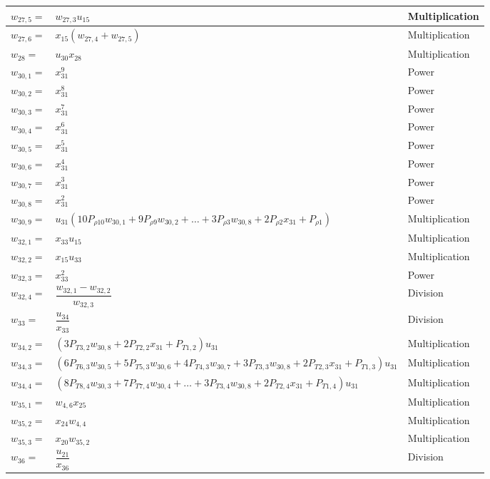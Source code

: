 \begin{longtable}{|p{1.5cm}|l|p{2cm}|}
$w_{27,5}=$ & $ w_{27,3}u_{15} $ & Multiplication \\ \hline
$w_{27,6}=$ & $ x_{15}\left(w_{27,4}+w_{27,5}\right) $ & Multiplication \\ \hline 
$w_{28}=$ & $ u_{30}x_{28} $ & Multiplication \\ \hline
$w_{30,1}=$ & $ x_{31}^{9} $ & Power \\ \hline
$w_{30,2}=$ & $ x_{31}^{8} $ & Power \\ \hline
$w_{30,3}=$ & $ x_{31}^{7} $ & Power \\ \hline
$w_{30,4}=$ & $ x_{31}^{6} $ & Power \\ \hline
$w_{30,5}=$ & $ x_{31}^{5} $ & Power \\ \hline
$w_{30,6}=$ & $ x_{31}^{4} $ & Power \\ \hline
$w_{30,7}=$ & $ x_{31}^{3} $ & Power \\ \hline
$w_{30,8}=$ & $ x_{31}^{2} $ & Power \\ \hline
$w_{30,9}=$ & $ u_{31}\left(10 P_{\rho 10}w_{30,1}+9 P_{\rho 9}w_{30,2}+\dots+3 P_{\rho 3}w_{30,8}+2 P_{\rho 2}x_{31}+P_{\rho 1}\right) $ & Multiplication \\ \hline
$w_{32,1}=$ & $ x_{33}u_{15} $ & Multiplication \\ \hline
$w_{32,2}=$ & $ x_{15}u_{33} $ & Multiplication \\ \hline
$w_{32,3}=$ & $ x_{33}^{2} $ & Power \\ \hline
$w_{32,4}=$ & $ \dfrac{w_{32,1}-w_{32,2}}{w_{32,3}} $ & Division \\ \hline
$w_{33}=$ & $ \dfrac{u_{34}}{x_{33}} $ & Division \\ \hline
$w_{34,2}=$ & $ \left(3P_{T 3,2}w_{30,8}+2P_{T 2,2}x_{31}+P_{T 1,2}\right)u_{31} $ & Multiplication \\ \hline
$w_{34,3}=$ & $ \left(6 P_{T 6,3}w_{30,5}+5P_{T 5,3}w_{30,6}+4P_{T 4,3}w_{30,7}+3P_{T 3,3}w_{30,8}+2P_{T 2,3}x_{31}+P_{T 1,3}\right)u_{31} $ & Multiplication \\ \hline
$w_{34,4}=$ & $ \left(8 P_{T 8,4}w_{30,3}+7P_{T 7,4}w_{30,4}+\dots+3P_{T 3,4}w_{30,8}+2P_{T 2,4}x_{31}+P_{T 1,4}\right)u_{31} $ & Multiplication \\ \hline
$w_{35,1}=$ & $ w_{4,6}x_{25} $ & Multiplication \\ \hline 
$w_{35,2}=$ & $ x_{24}w_{4,4} $ & Multiplication \\ \hline 
$w_{35,3}=$ & $ x_{20}w_{35,2} $ & Multiplication\\ \hline 
$w_{36}=$ & $ \dfrac{u_{21}}{x_{36}} $ & Division \\ \hline 

\end{longtable}
